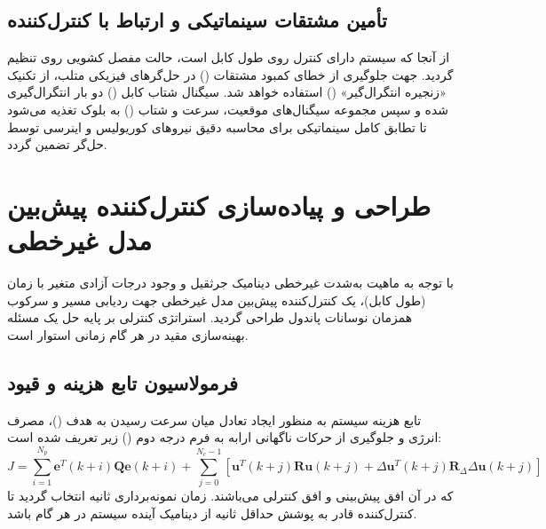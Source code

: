 \subsection{تأمین مشتقات سینماتیکی و ارتباط با کنترل‌کننده}
از آنجا که سیستم دارای کنترل روی طول کابل است، حالت مفصل کشویی روی  تنظیم گردید. جهت جلوگیری از خطای کمبود مشتقات () در حل‌گرهای فیزیکی متلب، از تکنیک «زنجیره انتگرال‌گیر» () استفاده خواهد شد. سیگنال شتاب کابل () دو بار انتگرال‌گیری شده و سپس مجموعه سیگنال‌های موقعیت، سرعت و شتاب () به بلوک  تغذیه می‌شود تا تطابق کامل سینماتیکی برای محاسبه دقیق نیروهای کوریولیس و اینرسی توسط حل‌گر  تضمین گردد.

\section{طراحی و پیاده‌سازی کنترل‌کننده پیش‌بین مدل غیرخطی }

با توجه به ماهیت به‌شدت غیرخطی دینامیک جرثقیل و وجود درجات آزادی متغیر با زمان (طول کابل)، یک کنترل‌کننده پیش‌بین مدل غیرخطی جهت ردیابی مسیر و سرکوب همزمان نوسانات پاندول طراحی گردید. استراتژی کنترلی بر پایه حل یک مسئله بهینه‌سازی مقید در هر گام زمانی استوار است.

\subsection{فرمولاسیون تابع هزینه و قیود}
تابع هزینه سیستم به منظور ایجاد تعادل میان سرعت رسیدن به هدف ()، مصرف انرژی و جلوگیری از حرکات ناگهانی ارابه به فرم درجه دوم () زیر تعریف شده است:
\begin{equation}
    J = \sum_{i=1}^{N_p} \mathbf{e}^T(k+i) \mathbf{Q} \mathbf{e}(k+i) + \sum_{j=0}^{N_c-1} \left[ \mathbf{u}^T(k+j) \mathbf{R} \mathbf{u}(k+j) + \Delta\mathbf{u}^T(k+j) \mathbf{R}_{\Delta} \Delta\mathbf{u}(k+j) \right]
\end{equation}
که در آن  افق پیش‌بینی و  افق کنترلی می‌باشند. زمان نمونه‌برداری  ثانیه انتخاب گردید تا کنترل‌کننده قادر به پوشش حداقل  ثانیه از دینامیک آینده سیستم در هر گام باشد.

